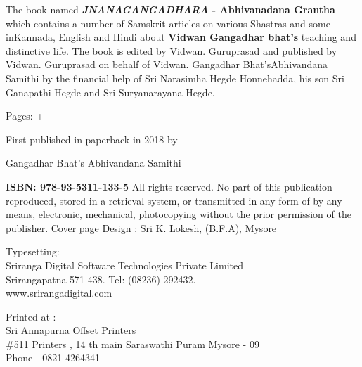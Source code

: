 \thispagestyle{empty}
{\fontsize{10}{12}\selectfont

The book named \textbf{\emph{JNANAGANGADHARA }- Abhivanadana Grantha} which contains a number of Samskrit articles on various Shastras and some in\break Kannada, English and Hindi about \textbf{Vidwan Gangadhar bhat’s} teaching and  distinctive life. The book is edited by Vidwan. Guruprasad and published by Vidwan. Guruprasad on behalf of Vidwan. Gangadhar Bhat’s\break Abhivandana Samithi by the financial help of Sri Narasimha Hegde Honnehadda, his son Sri Ganapathi Hegde and Sri Suryanarayana Hegde.

\begin{flushleft}

\bigskip
Pages: \pageref{prelims_pages} + \pageref{bookend}

First published in paperback in 2018 by

Gangadhar Bhat’s Abhivandana Samithi

\vfill
\bigskip
\textbf{ISBN: 978-93-5311-133-5}
\vfill
\bigskip
All rights reserved. No part of this publication reproduced, stored in a retrieval system, or transmitted in any form of by any means, electronic, mechanical, photocopying without the prior permission of the publisher.
\vfill
 \vfill
\bigskip
Cover page Design : Sri K. Lokesh, (B.F.A), Mysore

\bigskip
\noindent
Typesetting:\\ 
{\selectfont Sriranga Digital Software Technologies Private Limited}\\ 
Srirangapatna 571 438. Tel: (08236)-292432.\\
www.srirangadigital.com
\vfill

\bigskip
Printed at :\\
Sri Annapurna Offset Printers\\
\#511 Printers , 14 th main Saraswathi Puram Mysore - 09\\
Phone - 0821 4264341

\end{flushleft}

}

